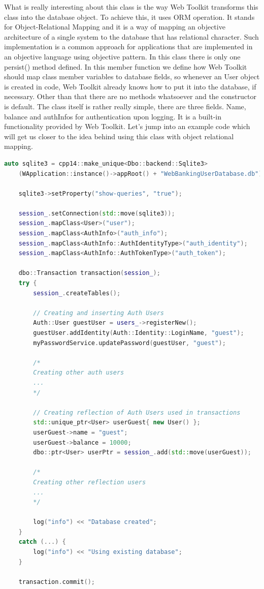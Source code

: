 \documentclass[a4paper,12pt]{book}
\begin{document}
What is really interesting about this class is the way Web Toolkit transforms this class into the database object. To achieve this, it uses ORM operation. It stands for Object-Relational Mapping and it is a way of mapping an objective architecture of a single system to the database that has relational character. Such implementation is a common approach for applications that are implemented in an objective language using objective pattern. In this class there is only one persist() method defined. In this member function we define how Web Toolkit should map class member variables to database fields, so whenever an User object is created in code, Web Toolkit already knows how to put it into the database, if necessary. Other than that there are no methods whatsoever and the constructor is default. The class itself is rather really simple, there are three fields. Name, balance and authInfos for authentication upon logging. It is a built-in functionality provided by Web Toolkit. Let's jump into an example code which will get us closer to the idea behind using this class with object relational mapping.

\bigskip
\begin{lstlisting}[frame=single, basicstyle=\small, language=C++, caption={Example usage of object-relational mapping on User class. This logic happens in constructor of Session class, which is called upon turning the application on.}, captionpos=b]
	auto sqlite3 = cpp14::make_unique<Dbo::backend::Sqlite3>
	(WApplication::instance()->appRoot() + "WebBankingUserDatabase.db");

	sqlite3->setProperty("show-queries", "true");

	session_.setConnection(std::move(sqlite3));
	session_.mapClass<User>("user");
	session_.mapClass<AuthInfo>("auth_info");
	session_.mapClass<AuthInfo::AuthIdentityType>("auth_identity");
	session_.mapClass<AuthInfo::AuthTokenType>("auth_token");
	
	dbo::Transaction transaction(session_);
	try {
		session_.createTables();
	
		// Creating and inserting Auth Users
		Auth::User guestUser = users_->registerNew();
		guestUser.addIdentity(Auth::Identity::LoginName, "guest");
		myPasswordService.updatePassword(guestUser, "guest");
		
		/*
		Creating other auth users
		...
		*/
		
		// Creating reflection of Auth Users used in transactions
		std::unique_ptr<User> userGuest{ new User() };
		userGuest->name = "guest";
		userGuest->balance = 10000;
		dbo::ptr<User> userPtr = session_.add(std::move(userGuest));
		
		/*
		Creating other reflection users
		...
		*/
		
		log("info") << "Database created";
	}
	catch (...) {
		log("info") << "Using existing database";
	}

	transaction.commit();
		
\end{lstlisting}
	
\end{document}
